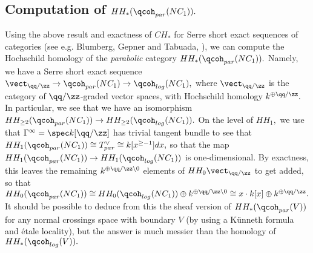 \documentclass{article}
\begin{document}
\subsection{Computation of $HH_*(\qcoh_{par}(NC_1)).$}
  Using the above result and exactness of $CH_*$ for Serre short exact sequences of categories (see e.g. Blumberg, Gepner and Tabuada, \cite{blumberg-gepner-tabuada}), we can compute the Hochschild homology of the \emph{parabolic} category $HH_*(\qcoh_{par}(NC_1)).$ Namely, we have a Serre short exact sequence $\vect_{\qq/\zz}\to \qcoh_{par}(NC_1)\to \qcoh_{log}(NC_1),$ where $\vect_{\qq/\zz}$ is the category of $\qq/\zz$-graded vector spaces, with Hochschild homology $k^{\oplus \qq/\zz}.$ In particular, we see that we have an isomorphism $HH_{\ge 2}(\qcoh_{par}(NC_1))\to HH_{\ge 2}(\qcoh_{log}(NC_1)).$  On the level of $HH_1,$ we use that $\Gamma^\infty= \spec k[\qq/\zz]$ has trivial tangent bundle to see that $HH_1(\qcoh_{par}(NC_1))\cong T^\vee_{par}\cong k[x^{\ge -1}]dx,$ so that the map $HH_1(\qcoh_{par}(NC_1))\to HH_1(\qcoh_{log}(NC_1))$ is one-dimensional. By exactness, this leaves the remaining $k^{\oplus \qq/\zz\setminus 0}$ elements of $HH_0\vect_{\qq/\zz}$ to get added, so that $HH_0(\qcoh_{par}(NC_1))\cong HH_0(\qcoh_{log}(NC_1))\oplus k^{\oplus \qq/\zz\setminus 0}\cong x \cdot k[x]\oplus k^{\oplus \qq/\zz}.$ It should be possible to deduce from this the sheaf version of $HH_*(\qcoh_{par}(V))$ for any normal crossings space with boundary $V$ (by using a K\"unneth formula and \'etale locality), but the answer is much messier than the homology of $HH_*(\qcoh_{log}(V)).$ 


\nocite{*}
{}

\end{document}
